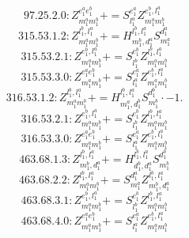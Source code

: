 \documentclass[letterpaper,10pt,fleqn,leqno,onecolumn]{article}
\begin{document}
\begin{equation} \;\;\;\;\;\;  97.25.2.0: Z^{e_{1}^{a}e_{1}^{b}}_{m_{1}^{a}m_{1}^{b}}+=S^{e_{1}^{a}}_{l_{1}^{a}}Z^{e_{1}^{b},l_{1}^{a}}_{m_{1}^{a}m_{1}^{b}} \end{equation}
\begin{equation} \;\;\;\;\;\;  315.53.1.2: Z^{l_{1}^{b},l_{1}^{a}}_{m_{1}^{a}m_{1}^{b}}+=H^{l_{1}^{b},l_{1}^{a}}_{m_{1}^{b},d_{1}^{a}}S^{d_{1}^{a}}_{m_{1}^{a}} \end{equation}
\begin{equation} \;\;\;\;\;\;  315.53.2.1: Z^{e_{1}^{b},l_{1}^{a}}_{m_{1}^{a}m_{1}^{b}}+=S^{e_{1}^{b}}_{l_{1}^{b}}Z^{l_{1}^{b},l_{1}^{a}}_{m_{1}^{a}m_{1}^{b}} \end{equation}
\begin{equation} \;\;\;\;\;\;  315.53.3.0: Z^{e_{1}^{a}e_{1}^{b}}_{m_{1}^{a}m_{1}^{b}}+=S^{e_{1}^{a}}_{l_{1}^{a}}Z^{e_{1}^{b},l_{1}^{a}}_{m_{1}^{a}m_{1}^{b}} \end{equation}
\begin{equation} \;\;\;\;\;\;  316.53.1.2: Z^{l_{1}^{b},l_{1}^{a}}_{m_{1}^{a}m_{1}^{b}}+=H^{l_{1}^{b},l_{1}^{a}}_{m_{1}^{a},d_{1}^{b}}S^{d_{1}^{b}}_{m_{1}^{b}}\cdot -1. \end{equation}
\begin{equation} \;\;\;\;\;\;  316.53.2.1: Z^{e_{1}^{b},l_{1}^{a}}_{m_{1}^{a}m_{1}^{b}}+=S^{e_{1}^{b}}_{l_{1}^{b}}Z^{l_{1}^{b},l_{1}^{a}}_{m_{1}^{a}m_{1}^{b}} \end{equation}
\begin{equation} \;\;\;\;\;\;  316.53.3.0: Z^{e_{1}^{a}e_{1}^{b}}_{m_{1}^{a}m_{1}^{b}}+=S^{e_{1}^{a}}_{l_{1}^{a}}Z^{e_{1}^{b},l_{1}^{a}}_{m_{1}^{a}m_{1}^{b}} \end{equation}
\begin{equation} \;\;\;\;\;\;  463.68.1.3: Z^{l_{1}^{b},l_{1}^{a}}_{m_{1}^{b},d_{1}^{a}}+=H^{l_{1}^{b},l_{1}^{a}}_{d_{1}^{b},d_{1}^{a}}S^{d_{1}^{b}}_{m_{1}^{b}} \end{equation}
\begin{equation} \;\;\;\;\;\;  463.68.2.2: Z^{l_{1}^{b},l_{1}^{a}}_{m_{1}^{a}m_{1}^{b}}+=S^{d_{1}^{a}}_{m_{1}^{a}}Z^{l_{1}^{b},l_{1}^{a}}_{m_{1}^{b},d_{1}^{a}} \end{equation}
\begin{equation} \;\;\;\;\;\;  463.68.3.1: Z^{e_{1}^{b},l_{1}^{a}}_{m_{1}^{a}m_{1}^{b}}+=S^{e_{1}^{b}}_{l_{1}^{b}}Z^{l_{1}^{b},l_{1}^{a}}_{m_{1}^{a}m_{1}^{b}} \end{equation}
\begin{equation} \;\;\;\;\;\;  463.68.4.0: Z^{e_{1}^{a}e_{1}^{b}}_{m_{1}^{a}m_{1}^{b}}+=S^{e_{1}^{a}}_{l_{1}^{a}}Z^{e_{1}^{b},l_{1}^{a}}_{m_{1}^{a}m_{1}^{b}} \end{equation}
\end{document}
